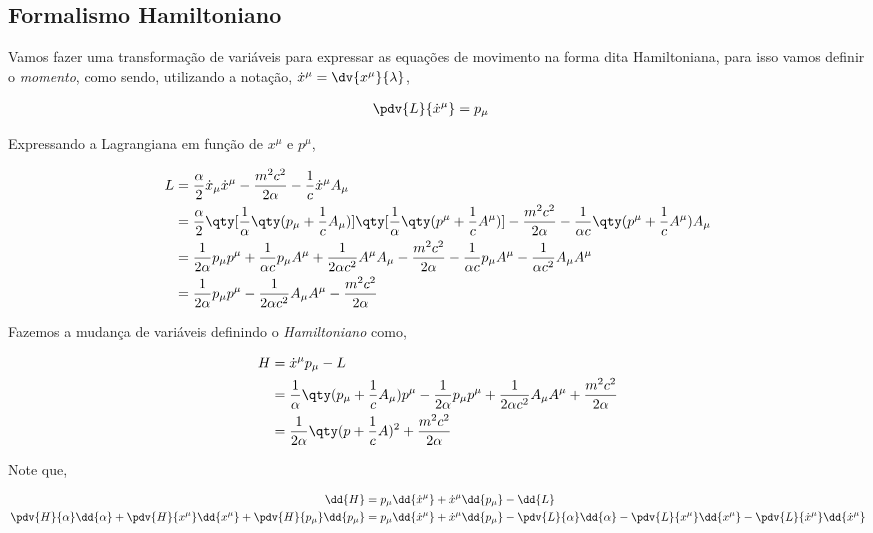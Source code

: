\documentclass[twoside]{amsart}
\numberwithin{equation}{section}
\begin{document}
\begin{refsection}
\section{Formalismo Hamiltoniano}

Vamos fazer uma transformação de variáveis para expressar as equações de movimento na forma dita Hamiltoniana, para isso vamos definir o \emph{momento}, como sendo, utilizando a notação, ${\dot x}^\mu=\dv{x^\mu}{\lambda}$,

\begin{align}
    \pdv{L}{{\dot x}^\mu}&=p_\mu
\end{align}

Expressando a Lagrangiana em função de $x^\mu$ e $p^\mu$,

\begin{align}
    L&=\frac\alpha2{\dot x}_\mu{\dot x}^\mu-\frac{m^2c^2}{2\alpha}-\frac1c{\dot x}^\mu A_\mu\\
    &=\frac\alpha2\qty[\frac1\alpha\qty(p_\mu+\frac1c A_\mu)]\qty[\frac1\alpha\qty(p^\mu+\frac1c A^\mu)]-\frac{m^2c^2}{2\alpha}-\frac{1}{\alpha c}\qty(p^\mu +\frac1c A^\mu)A_\mu\\
    &=\frac{1}{2\alpha}p_\mu p^\mu+\frac{1}{\alpha c}p_\mu A^\mu+\frac{1}{2\alpha c^2}A^\mu A_\mu-\frac{m^2c^2}{2\alpha}-\frac{1}{\alpha c}p_\mu A^\mu -\frac{1}{\alpha c^2}A_\mu A^\mu\\
    &=\frac{1}{2\alpha}p_\mu p^\mu-\frac{1}{2\alpha c^2}A_\mu A^\mu-\frac{m^2c^2}{2\alpha}
\end{align}

Fazemos a mudança de variáveis definindo o \emph{Hamiltoniano} como,

\begin{align}
    H&={\dot x}^\mu p_\mu-L\\
    &=\frac1\alpha\qty(p_\mu+\frac1c A_\mu)p^\mu-\frac{1}{2\alpha}p_\mu p^\mu+\frac{1}{2\alpha c^2}A_\mu A^\mu +\frac{m^2c^2}{2\alpha}\\
    &=\frac{1}{2\alpha}\qty(p+\frac1c A)^2+\frac{m^2c^2}{2\alpha}
\end{align}

Note que,

\begin{align}
    \dd{H}&=p_\mu \dd{\dot{x}^\mu}+\dot{x}^\mu\dd{p_\mu}-\dd{L}\\
    \pdv{H}{\alpha}\dd{\alpha}+\pdv{H}{x^\mu}\dd{x^\mu}+\pdv{H}{p_\mu}\dd{p_\mu}&=p_\mu \dd{\dot{x}^\mu}+\dot{x}^\mu\dd{p_\mu}-\pdv{L}{\alpha}\dd{\alpha}-\pdv{L}{x^\mu}\dd{x^\mu}-\pdv{L}{\dot{x}^\mu}\dd{\dot{x}^\mu}
\end{align}


\end{refsection}
\end{document}
